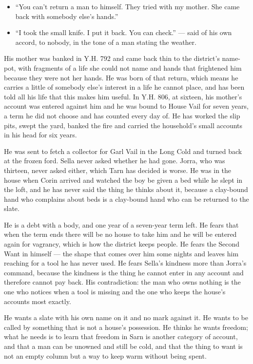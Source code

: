 \documentclass{design/chronicle}
\begin{document}
{\begin{itemize}[leftmargin=1.4em,itemsep=1pt,topsep=3pt,parsep=0pt]
\item “You can’t return a man to himself. They tried with my mother. She came back with somebody else’s hands.”

\item “I took the small knife. I put it back. You can check.” --- said of his own accord, to nobody, in the tone of a man stating the weather.

\end{itemize}

His mother was banked in Y.H. 792 and came back thin to the district’s name-pot, with fragments of a life she could not name and hands that frightened him because they were not her hands. He was born of that return, which means he carries a little of somebody else’s interest in a life he cannot place, and has been told all his life that this makes him useful. In Y.H. 806, at sixteen, his mother’s account was entered against him and he was bound to House Vail for seven years, a term he did not choose and has counted every day of. He has worked the slip pits, swept the yard, banked the fire and carried the household’s small accounts in his head for six years.

He was sent to fetch a collector for Garl Vail in the Long Cold and turned back at the frozen ford. Sella never asked whether he had gone. Jorra, who was thirteen, never asked either, which Tarn has decided is worse. He was in the house when Corin arrived and watched the boy be given a bed while he slept in the loft, and he has never said the thing he thinks about it, because a clay-bound hand who complains about beds is a clay-bound hand who can be returned to the slate.

He is a debt with a body, and one year of a seven-year term left. He fears that when the term ends there will be no house to take him and he will be entered again for vagrancy, which is how the district keeps people. He fears the Second Want in himself — the shape that comes over him some nights and leaves him reaching for a tool he has never used. He fears Sella’s kindness more than Jorra’s command, because the kindness is the thing he cannot enter in any account and therefore cannot pay back. His contradiction: the man who owns nothing is the one who notices when a tool is missing and the one who keeps the house’s accounts most exactly.

He wants a slate with his own name on it and no mark against it. He wants to be called by something that is not a house’s possession. He thinks he wants freedom; what he needs is to learn that freedom in Sarn is another category of account, and that a man can be unowned and still be cold, and that the thing to want is not an empty column but a way to keep warm without being spent.

}
\end{document}
